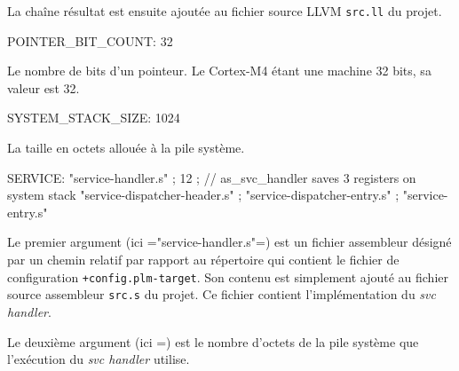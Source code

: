 La chaîne résultat est ensuite ajoutée au fichier source LLVM \texttt{src.ll} du projet.








\begin{PLM}
POINTER_BIT_COUNT:
  32
\end{PLM}

Le nombre de bits d'un pointeur. Le Cortex-M4 étant une machine 32 bits, sa valeur est 32.













\begin{PLM}
SYSTEM_STACK_SIZE:
  1024
\end{PLM}

La taille en octets allouée à la pile système.








\begin{PLM}
SERVICE:
  "service-handler.s" ;
  12 ; // as_svc_handler saves 3 registers on system stack
  "service-dispatcher-header.s" ;
  "service-dispatcher-entry.s" ;
  "service-entry.s"
\end{PLM}

Le premier argument (ici \plm="service-handler.s"=) est un fichier assembleur désigné par un chemin relatif par rapport au répertoire qui contient le fichier de configuration \texttt{+config.plm-target}. Son contenu est simplement ajouté au fichier source assembleur \texttt{src.s} du projet. Ce fichier contient l'implémentation du \emph{svc handler}.

Le deuxième argument (ici =) est le nombre d'octets de la pile système que l'exécution du \emph{svc handler} utilise.


